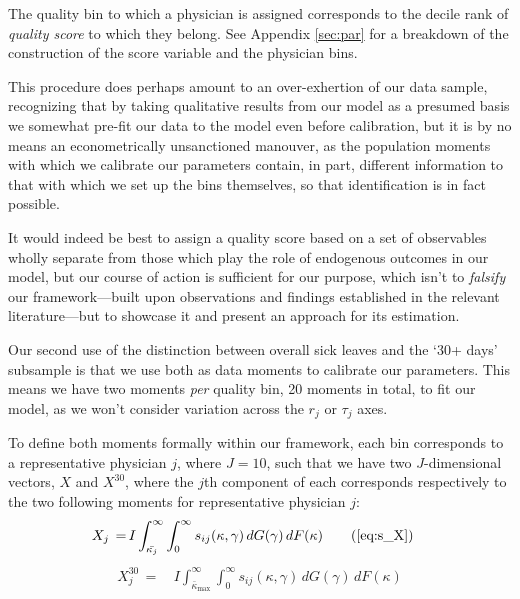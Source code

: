\documentclass[../main.tex]{subfiles}
\begin{document}
The quality bin to which a physician is assigned corresponds to the decile rank of \textit{quality score} to which they belong. See Appendix \ref{sec:par} for a breakdown of the construction of the score variable and the physician bins.

This procedure does perhaps amount to an over-exhertion of our data sample, recognizing that by taking qualitative results from our model as a presumed basis we somewhat pre-fit our data to the model even before calibration, but it is by no means an econometrically unsanctioned manouver, as the population moments with which we calibrate our parameters contain, in part, different information to that with which we set up the bins themselves, so that identification is in fact possible. 

It would indeed be best to assign a quality score based on a set of observables wholly separate from those which play the role of endogenous outcomes in our model, but our course of action is sufficient for our purpose, which isn't to \textit{falsify} our framework—built upon observations and findings established in the relevant literature—but to showcase it and present an approach for its estimation.

Our second use of the distinction between overall sick leaves and the `30+ days' subsample is that we use both as data moments to calibrate our parameters. This means we have two moments \textit{per} quality bin, 20 moments in total, to fit our model, as we won't consider variation across the $r_j$ or $\tau_j$ axes.

To define both moments formally within our framework, each bin corresponds to a representative physician $j$, where $J = 10$, such that we have two $J$-dimensional vectors, $X$ and $X^{30}$, where the $j$th component of each corresponds respectively to the two following moments for representative physician $j$:
\begin{align}
    X_j \,=\, &  I \int_{\bar{\kappa_j}}^{\infty} \int_{0}^{\infty}s_{ij}(\kappa, \gamma)  \,dG(\gamma) \,dF(\kappa) \tag{\ref{eq:s_X}}
\end{align}
\begin{align}
    X_j^{30} \,=\, & I \int_{\bar{\kappa}_{\max}}^{\infty} \int_{0}^{\infty}s_{ij}(\kappa, \gamma)  \,dG(\gamma) \,dF(\kappa)
    \label{eq:X30}
\end{align}
\end{document}
